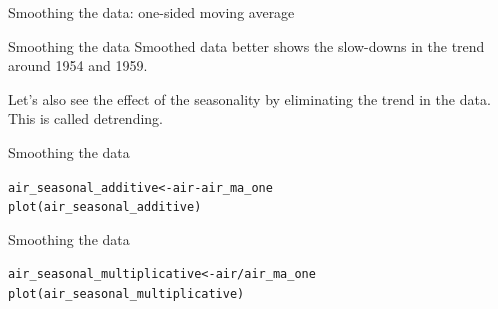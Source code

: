 \documentclass{beamer}\usepackage[]{graphicx}\usepackage[]{color}
\makeatletter
\newcommand{\hlopt}[1]{\textcolor[rgb]{1,0.894,0.769}{#1}}%
\newcommand{\hlstd}[1]{\textcolor[rgb]{1,0.894,0.769}{#1}}%
\newcommand{\hlkwb}[1]{\textcolor[rgb]{0.804,0.776,0.451}{#1}}%
\newcommand{\hlkwd}[1]{\textcolor[rgb]{1,0.78,0.769}{#1}}%
\newenvironment{kframe}{%
 \def\at@end@of@kframe{}%
 \ifinner\ifhmode%
  \def\at@end@of@kframe{\end{minipage}}%
  \begin{minipage}{\columnwidth}%
 \fi\fi%
 \def\FrameCommand##1{\hskip\@totalleftmargin \hskip-\fboxsep
 \colorbox{shadecolor}{##1}\hskip-\fboxsep
     \hskip-\linewidth \hskip-\@totalleftmargin \hskip\columnwidth}%
 \MakeFramed {\advance\hsize-\width
   \@totalleftmargin\z@ \linewidth\hsize
   \@setminipage}}%
 {\par\unskip\endMakeFramed%
 \at@end@of@kframe}
\newenvironment{knitrout}{}{} %
\makeatother
\begin{document}
\begin{darkframes}
\begin{frame}[fragile]{Smoothing the data: one-sided moving average}
\begin{knitrout}
\end{knitrout}
    
    \end{frame}
    
    
    
    
    \begin{frame}[fragile]{Smoothing the data}
      \fontsize{9}{9}\selectfont
      Smoothed data better shows the slow-downs in the trend around 1954 and 1959.
      \bigskip
      
      Let's also see the effect of the seasonality by eliminating the trend in the data. This is called \alert{detrending}.

    \end{frame}
    
    
    
    \begin{frame}[fragile]{Smoothing the data}
      \fontsize{9}{9}\selectfont
     
\begin{knitrout}
\begin{kframe}
\begin{alltt}
      \hlstd{air_seasonal_additive} \hlkwb{<-} \hlstd{air} \hlopt{-} \hlstd{air_ma_one}
      \hlkwd{plot}\hlstd{(air_seasonal_additive)}
\end{alltt}
\end{kframe}


\end{knitrout}
  
    \end{frame}
    
    
      \begin{frame}[fragile]{Smoothing the data}
      \fontsize{9}{9}\selectfont
     
\begin{knitrout}
\begin{kframe}
\begin{alltt}
      \hlstd{air_seasonal_multiplicative} \hlkwb{<-} \hlstd{air}\hlopt{/} \hlstd{air_ma_one}
      \hlkwd{plot}\hlstd{(air_seasonal_multiplicative)}
\end{alltt}
\end{kframe}


\end{knitrout}
  
    \end{frame}
    

\end{darkframes}
\end{document}
